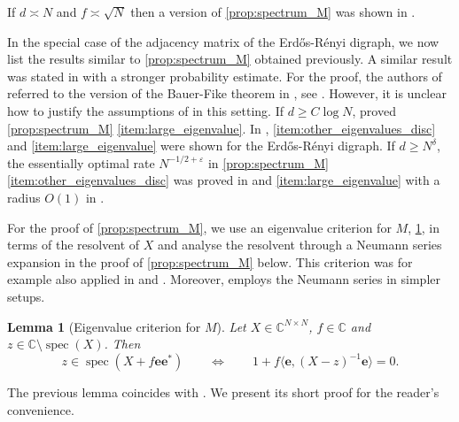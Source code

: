 \documentclass[10pt,a4paper]{amsart}
\DeclareMathOperator{\spec}{spec}
\newcommand{\C}{\mathbb{C}}
\newcommand{\eps}{\varepsilon}
\newtheorem{lemma}{Lemma}[section]
\numberwithin{equation}{section}
\newcommand{\nc}{\normalcolor}
\begin{document}
If $d \asymp N$ and $f \asymp \sqrt{N}$ then a version of \cref{prop:spectrum_M} was shown in  \cite[Theorem~1.9]{zbMATH06141055}. 

In the special case of the adjacency matrix of the Erd{\H o}s-R\'enyi digraph, we now list the 
results similar to \cref{prop:spectrum_M} obtained previously.  
A similar result 
was stated in \cite[Corollary~3.5]{BBK_spec_radii} with a stronger probability estimate. 
For the proof, the authors of \cite{BBK_spec_radii} referred to the version of the Bauer-Fike theorem in 
\cite{BLL2018Nonbacktracking}, see  \cite[Proposition~7]{BLL2018Nonbacktracking}. 
However, it is unclear how to justify the assumptions of \cite[Proposition~7]{BLL2018Nonbacktracking} in this setting. 
If $d \geq C \log N$, \cite[Corollary~1]{MR4206685} proved \cref{prop:spectrum_M} \cref{item:large_eigenvalue}. In \cite[Theorem~4.3]{MR4649432}, \cref{item:other_eigenvalues_disc} and \cref{item:large_eigenvalue} were shown for the Erd{\H o}s-R\'enyi digraph. 
If $d \geq N^\delta$, the essentially optimal rate $N^{-1/2+\eps}$ in \cref{prop:spectrum_M} \cref{item:other_eigenvalues_disc}
was proved in \cite[Theorem~1.2(i)]{HeDigraph} and \cref{item:large_eigenvalue} 
with a radius $O(1)$ in \cite[Lemma~4.5]{HeDigraph}.  

For the proof of \cref{prop:spectrum_M}, we use an eigenvalue criterion for $M$, 
\cref{lem:eigenvalue_criterion}, in terms of the resolvent of $X$ and analyse the resolvent through a Neumann series expansion in the proof of \cref{prop:spectrum_M} below. 
 This criterion was for example also applied \nc in \cite[Section~4.1]{BGN11} and \cite[ Sections~2, 3 and 5]{zbMATH06141055}. Moreover, \cite{zbMATH06141055} employs the Neumann series in simpler setups. 


\begin{lemma}[Eigenvalue criterion for $M$] \label{lem:eigenvalue_criterion}
Let $X \in \C^{N\times N}$,  $f \in \C$ and $z \in \C \setminus \spec(X)$. Then 
\[ z \in \spec ( X + f \mathbf e \mathbf e^*) \qquad \iff \qquad 1 + f\langle \mathbf e, (X-z)^{-1} \mathbf e \rangle =0. 
\] 
\end{lemma} 

 The previous lemma coincides with \cite[Lemma 2.1]{zbMATH06141055}.
We present its short proof for the reader's convenience.
\end{document}
